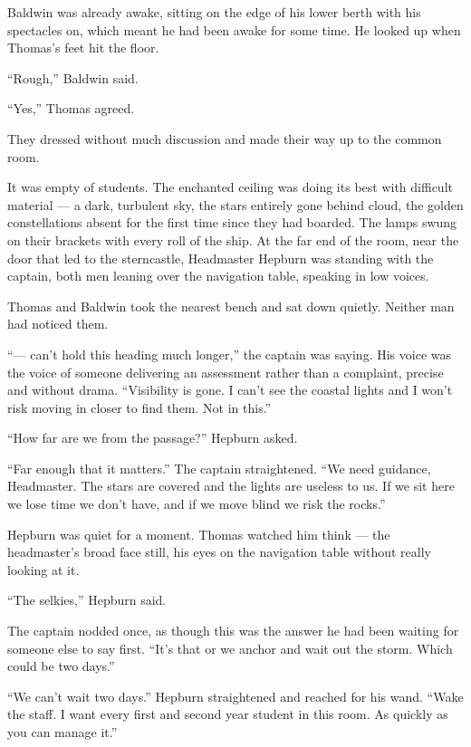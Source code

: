 Baldwin was already awake, sitting on the edge of his lower berth with his spectacles on, which meant he had been awake for some time. He looked up when Thomas's feet hit the floor.

\enquote{Rough,} Baldwin said.

\enquote{Yes,} Thomas agreed.

They dressed without much discussion and made their way up to the common room.

It was empty of students. The enchanted ceiling was doing its best with difficult material --- a dark, turbulent sky, the stars entirely gone behind cloud, the golden constellations absent for the first time since they had boarded. The lamps swung on their brackets with every roll of the ship. At the far end of the room, near the door that led to the sterncastle, Headmaster Hepburn was standing with the captain, both men leaning over the navigation table, speaking in low voices.

Thomas and Baldwin took the nearest bench and sat down quietly. Neither man had noticed them.

\enquote{--- can't hold this heading much longer,} the captain was saying. His voice was the voice of someone delivering an assessment rather than a complaint, precise and without drama. \enquote{Visibility is gone. I can't see the coastal lights and I won't risk moving in closer to find them. Not in this.}

\enquote{How far are we from the passage?} Hepburn asked.

\enquote{Far enough that it matters.} The captain straightened. \enquote{We need guidance, Headmaster. The stars are covered and the lights are useless to us. If we sit here we lose time we don't have, and if we move blind we risk the rocks.}

Hepburn was quiet for a moment. Thomas watched him think --- the headmaster's broad face still, his eyes on the navigation table without really looking at it.

\enquote{The selkies,} Hepburn said.

The captain nodded once, as though this was the answer he had been waiting for someone else to say first. \enquote{It's that or we anchor and wait out the storm. Which could be two days.}

\enquote{We can't wait two days.} Hepburn straightened and reached for his wand. \enquote{Wake the staff. I want every first and second year student in this room. As quickly as you can manage it.}

